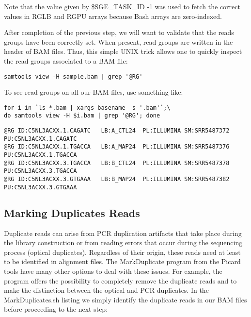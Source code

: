 Note that the value given by \$SGE\_TASK\_ID -1 was used to fetch the correct values in RGLB and RGPU arrays because Bash arrays are zero-indexed.

After completion of the previous step, we will want to validate that the reads groups have been correctly set. When present, read groups are written in the header of BAM files. Thus, this simple UNIX trick allows one to quickly inspect the read groups associated to a BAM file:

\begin{verbatim}
samtools view -H sample.bam | grep '@RG'	
\end{verbatim}


To see read groups on all our BAM files, use something like:

\begin{verbatim}
for i in `ls *.bam | xargs basename -s '.bam'`;\
do samtools view -H $i.bam | grep '@RG'; done
\end{verbatim}

\begin{small}
\begin{verbatim}
@RG	ID:C5NL3ACXX.1.CAGATC	LB:A_CTL24	PL:ILLUMINA	SM:SRR5487372	PU:C5NL3ACXX.1.CAGATC
@RG	ID:C5NL3ACXX.1.TGACCA	LB:A_MAP24	PL:ILLUMINA	SM:SRR5487376	PU:C5NL3ACXX.1.TGACCA
@RG	ID:C5NL3ACXX.3.TGACCA	LB:B_CTL24	PL:ILLUMINA	SM:SRR5487378	PU:C5NL3ACXX.3.TGACCA
@RG	ID:C5NL3ACXX.3.GTGAAA	LB:B_MAP24	PL:ILLUMINA	SM:SRR5487382	PU:C5NL3ACXX.3.GTGAAA
\end{verbatim}
\end{small}






\subsection{Marking Duplicates Reads}


Duplicate reads can arise from PCR duplication artifacts that take place during the library construction or from reading errors that occur during the sequencing process (optical duplicates). Regardless of their origin, these reads need at least to be identified in alignment files. The MarkDuplicate program from the Picard tools have many other options to deal with these issues. For example, the program offers the possibility to completely remove the duplicate reads and to make the distinction between the optical and PCR duplicates. In the MarkDuplicates.sh listing we simply identify the duplicate reads in our BAM files before proceeding to the next step:

